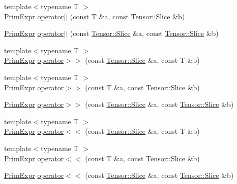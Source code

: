 \begin{DoxyCompactItemize}
\item 
{\footnotesize template$<$typename T $>$ }\\\hyperlink{classtvm_1_1PrimExpr}{Prim\+Expr} \hyperlink{namespacetvm_1_1te_a5be3fdf7d7b6e325b0d1887b47416918}{operator$\vert$$\vert$} (const T \&a, const \hyperlink{classtvm_1_1te_1_1Tensor_1_1Slice}{Tensor\+::\+Slice} \&b)
\item 
\hyperlink{classtvm_1_1PrimExpr}{Prim\+Expr} \hyperlink{namespacetvm_1_1te_a1619810ecdc1c9b051522a4313a2c24e}{operator$\vert$$\vert$} (const \hyperlink{classtvm_1_1te_1_1Tensor_1_1Slice}{Tensor\+::\+Slice} \&a, const \hyperlink{classtvm_1_1te_1_1Tensor_1_1Slice}{Tensor\+::\+Slice} \&b)
\item 
{\footnotesize template$<$typename T $>$ }\\\hyperlink{classtvm_1_1PrimExpr}{Prim\+Expr} \hyperlink{namespacetvm_1_1te_a4a8524467a57ae005654a3f0cb816e3f}{operator$>$$>$} (const \hyperlink{classtvm_1_1te_1_1Tensor_1_1Slice}{Tensor\+::\+Slice} \&a, const T \&b)
\item 
{\footnotesize template$<$typename T $>$ }\\\hyperlink{classtvm_1_1PrimExpr}{Prim\+Expr} \hyperlink{namespacetvm_1_1te_a8705a88b943011532ff4c94c4b06c213}{operator$>$$>$} (const T \&a, const \hyperlink{classtvm_1_1te_1_1Tensor_1_1Slice}{Tensor\+::\+Slice} \&b)
\item 
\hyperlink{classtvm_1_1PrimExpr}{Prim\+Expr} \hyperlink{namespacetvm_1_1te_a9d3d9a057d5f1a36277ac4005f38bafa}{operator$>$$>$} (const \hyperlink{classtvm_1_1te_1_1Tensor_1_1Slice}{Tensor\+::\+Slice} \&a, const \hyperlink{classtvm_1_1te_1_1Tensor_1_1Slice}{Tensor\+::\+Slice} \&b)
\item 
{\footnotesize template$<$typename T $>$ }\\\hyperlink{classtvm_1_1PrimExpr}{Prim\+Expr} \hyperlink{namespacetvm_1_1te_a8d52a6dd288ed59dd3f75fac6e3833f4}{operator$<$$<$} (const \hyperlink{classtvm_1_1te_1_1Tensor_1_1Slice}{Tensor\+::\+Slice} \&a, const T \&b)
\item 
{\footnotesize template$<$typename T $>$ }\\\hyperlink{classtvm_1_1PrimExpr}{Prim\+Expr} \hyperlink{namespacetvm_1_1te_afba65b87ed8a5587c48b1f63ff9d8437}{operator$<$$<$} (const T \&a, const \hyperlink{classtvm_1_1te_1_1Tensor_1_1Slice}{Tensor\+::\+Slice} \&b)
\item 
\hyperlink{classtvm_1_1PrimExpr}{Prim\+Expr} \hyperlink{namespacetvm_1_1te_a6bb44656b78b7d6a02ede706ed0a85ec}{operator$<$$<$} (const \hyperlink{classtvm_1_1te_1_1Tensor_1_1Slice}{Tensor\+::\+Slice} \&a, const \hyperlink{classtvm_1_1te_1_1Tensor_1_1Slice}{Tensor\+::\+Slice} \&b)

\end{DoxyCompactItemize}
